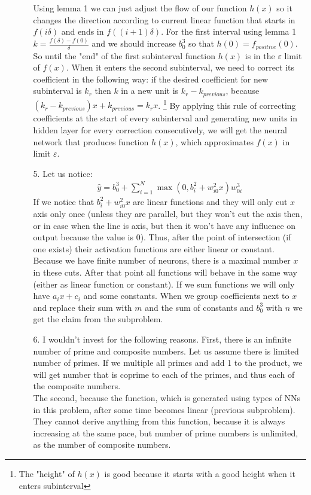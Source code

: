 \documentclass[10pt,a4paper]{article}
\begin{document}
\begin{enumerate}
\begin{enumerate}
Using lemma 1 we can just adjust the flow of our function $h(x)$ so it changes the direction according to current linear function that starts in $f(i\delta)$ and ends in $f((i+1)\delta)$.
For the first interval using lemma 1 $k = \frac{f(\delta) - f(0)}{\delta}$ and we should increase $b_0^3$ so that $h(0)=f_{positive}(0)$. So until the "end" of the first subinterval function $h(x)$ is in the $\varepsilon$ limit of $f(x)$. When it enters the second subinterval, we need to correct its coefficient in the following way:
if the desired coefficient for new subinterval is $k_r$ then $k$ in a new unit is $k_r - k_{previous}$, because 
$(k_r - k_{previous})x + k_{previous} = k_rx $. \footnote{The "height" of $h(x)$ is good because it starts with a good height when it enters subinterval}
By applying this rule of correcting coefficients at the start of every subinterval and generating new units in hidden layer for every correction consecutively, we will get the neural network that produces function $h(x)$, which approximates $f(x)$ in limit $\varepsilon$. 
\item[5.]
Let us notice:
\begin{align*}
\hat{y} = b_0^3 + \sum_{i=1}^N\max(0, b_i^2+w_{i0}^2x)w^3_{0i}
\end{align*}
If we notice that $ b_i^2+w_{i0}^2x$ are linear functions and they will only cut $x$ axis only once (unless they are parallel, but they won't cut the axis then, or in case when the line is axis, but then it won't have any influence on output because the value is 0). Thus, after the point of intersection (if one exists) their activation functions are either linear or constant. Because we have finite number of neurons, there is a maximal number $x$ in these cuts. After that point all functions will behave in the same way (either as linear function or constant). 
If we sum functions we will only have $a_ix + c_i$ and some constants. When we group coefficients next to $x$ and replace their sum with $m$ and the sum of constants and $b^3_0$ with $n$ we get the claim from the subproblem.
\item[6.]
I wouldn't invest for the following reasons. 
First, there is an infinite number of prime and composite numbers. Let us assume there is limited number of primes. If we multiple all primes and add 1 to the product, we will get number that is coprime to each of the primes, and thus each of the composite numbers. \\
The second, because the function, which is generated using types of NNs in this problem, after some time becomes linear (previous subproblem). They cannot derive anything from this function, because it is always increasing at the same pace, but number of prime numbers is unlimited, as the number of composite numbers.
\end{enumerate}
\end{enumerate}
\end{document}
